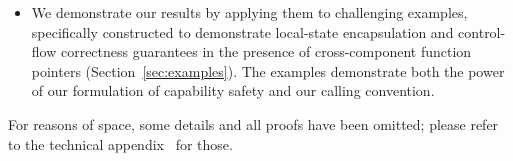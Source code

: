 \documentclass[format=acmsmall, review=false, screen=true]{acmart}
\renewcommand{\sectionname}{Section}
\newcommand\lau[1]{{\color{purple} \sf \footnotesize {LS: #1}}\\}
\newcommand\dominique[1]{{\color{purple} \sf \footnotesize {DD: #1}}\\}
\renewcommand\lau[1]{}
\renewcommand\dominique[1]{}
\begin{document}
\begin{itemize}
  logical relation used to formulate the above theorem: the use of a
  \emph{single} orthogonal closure (rather than the earlier used biorthogonal
  closure) and a variant of \citet{Dreyer:jfp12}'s public and private future
  worlds~\citep{Dreyer:jfp12} to express the special nature of local
  capabilities. The logical relation and the fundamental theorem expressing
  capability safety are presented in \sectionname~\ref{sec:logical-relation}.
\item We demonstrate our results by applying them to challenging examples,
  specifically constructed to demonstrate local-state encapsulation and
  control-flow correctness guarantees in the presence of cross-component
  function pointers (\sectionname~\ref{sec:examples}). The examples demonstrate both
  the power of our formulation of capability safety and our calling convention.
\end{itemize}

For reasons of space, some details and all proofs have been omitted; please
refer to the technical appendix~\citep{technical_appendix} for
those.\dominique{upload TA as supplementary material instead?}
\end{document}
